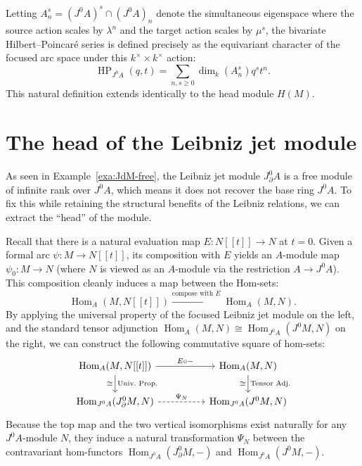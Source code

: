 \documentclass[a4paper, 12pt]{amsart}
\theoremstyle{definition}
\theoremstyle{remark}
\begin{document}
Letting $A^s_n = (J^0A)^s \cap (J^0A)_n$ denote the simultaneous eigenspace where the source action scales by $\lambda^n$ and the target action scales by $\mu^s$, the bivariate Hilbert--Poincar\'{e} series is defined precisely as the equivariant character of the focused arc space under this $k^\times \times k^\times$ action:
\begin{equation*}
  \operatorname{HP}_{J^0A}(q, t) = \sum_{n, s \ge 0} \dim_k(A^s_n) q^s t^n.
\end{equation*}
This natural definition extends identically to the head module $H(M)$.

\section{The head of the Leibniz jet module}
\label{sec:head-leibniz}

As seen in Example~\ref{exa:JdM-free}, the Leibniz jet module $J^0_\partial A$ is a free module of infinite rank over $J^0A$, which means it does not recover the base ring $J^0A$.
To fix this while retaining the structural benefits of the Leibniz relations, we can extract the ``head'' of the module.

Recall that there is a natural evaluation map $E: N[[t]] \to N$ at $t = 0$.
Given a formal arc $\psi: M \to N[[t]]$, its composition with $E$ yields an $A$-module map $\psi_0: M \to N$ (where $N$ is viewed as an $A$-module via the restriction $A \to J^0A$). This composition cleanly induces a map between the Hom-sets:
\begin{equation*}
  \operatorname{Hom}_A(M, N[[t]]) \xrightarrow{\text{compose with } E} \operatorname{Hom}_A(M, N).
\end{equation*}
By applying the universal property of the focused Leibniz jet module on the left, and the standard tensor adjunction $\operatorname{Hom}_A(M, N) \cong \operatorname{Hom}_{J^0A}(J^0M, N)$ on the right, we can construct the following commutative square of hom-sets:
\begin{equation*}
  \begin{tikzcd}[column sep=huge]
    \operatorname{Hom}_A(M, N[[t]]) \arrow[r, "E \circ -"] \arrow[d, "\cong"', "\text{Univ.\ Prop.}"] & \operatorname{Hom}_A(M, N) \arrow[d, "\cong"', "\text{Tensor Adj.}"] \\
    \operatorname{Hom}_{J^0A}(J^0_\partial M, N) \arrow[r, dashed, "\Psi_N"] & \operatorname{Hom}_{J^0A}(J^0M, N)
  \end{tikzcd}
\end{equation*}
Because the top map and the two vertical isomorphisms exist naturally for any $J^0A$-module $N$, they induce a natural transformation $\Psi_N$ between the contravariant hom-functors $\operatorname{Hom}_{J^0A}(J^0_\partial M, -)$ and $\operatorname{Hom}_{J^0A}(J^0M, -)$. 
\end{document}
